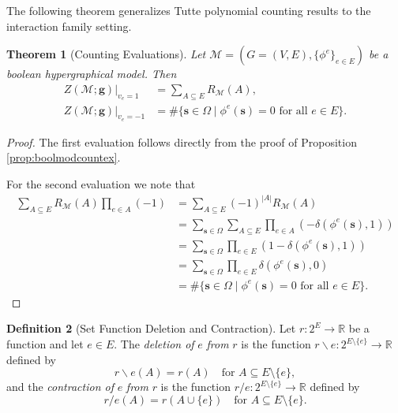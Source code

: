 \documentclass[11pt,reqno]{amsart}
\newcommand{\vecs}{\boldsymbol{s}}
\newcommand{\vecg}{\boldsymbol{g}}
\newcommand{\Mo}{\mathcal{M}}
\newcommand{\statespace}{\Omega}
\theoremstyle{plain}
\newtheorem{theorem}{Theorem}[section]
\theoremstyle{definition}
\newtheorem{definition}[theorem]{Definition}
\numberwithin{equation}{section}
\begin{document}
The following theorem generalizes Tutte polynomial counting results to the interaction family setting.

\begin{theorem}[Counting Evaluations]
    \label{theo:counteval}
    Let $\Mo = (G=(V,E), \{\phi^e\}_{e \in E})$ be a boolean hypergraphical model. Then
    \begin{align}
        Z(\Mo; \vecg)\big|_{v_e = 1} &= \sum_{A \subseteq E} R_{\Mo}(A),\\
        Z(\Mo; \vecg)\big|_{v_e = -1} &= \#  \{ \vecs \in \statespace \mid \phi^e(\vecs)=0 \text{ for all } e \in E \}.
    \end{align}

\end{theorem}
\begin{proof}
    The first evaluation follows directly from the proof of Proposition \ref{prop:boolmodcountex}.

    For the second evaluation we note that
    \begin{align*}
         \sum_{A \subseteq E} R_{\Mo}(A) \prod_{e \in A} (-1) &= \sum_{A \subseteq E} (-1)^{|A|} R_{\Mo}(A) \\
         &= \sum_{\vecs \in \statespace} \sum_{A \subseteq E} \prod_{e \in A} (-\delta(\phi^e(\vecs),1)) \\
         &= \sum_{\vecs \in \statespace} \prod_{e \in E}(1- \delta(\phi^e(\vecs),1)) \\
         &= \sum_{\vecs \in \statespace} \prod_{e\in E} \delta(\phi^e(\vecs),0) \\
         &= \# \{ \vecs \in \statespace \mid \phi^e(\vecs)=0 \text{ for all } e \in E \}.
    \end{align*}
\end{proof}

\begin{definition}[Set Function Deletion and Contraction]
    Let $r \colon 2^E \to \mathbb{R}$ be a function and let $e \in E$. The \emph{deletion of} $e$ \emph{from} $r$ is the function $r \backslash e \colon 2^{E \setminus \{e\}} \to \mathbb{R}$ defined by
    \[
    r\backslash e(A) = r(A) \quad \text{for } A \subseteq E \setminus \{e\},
    \]
    and the \emph{contraction of} $e$ \emph{from} $r$ is the function $r/e \colon 2^{E \setminus \{e\}} \to \mathbb{R}$ defined by
    \[
    r/e(A) = r(A \cup \{e\}) \quad \text{for } A \subseteq E \setminus \{e\}.
    \]
\end{definition}
\end{document}
